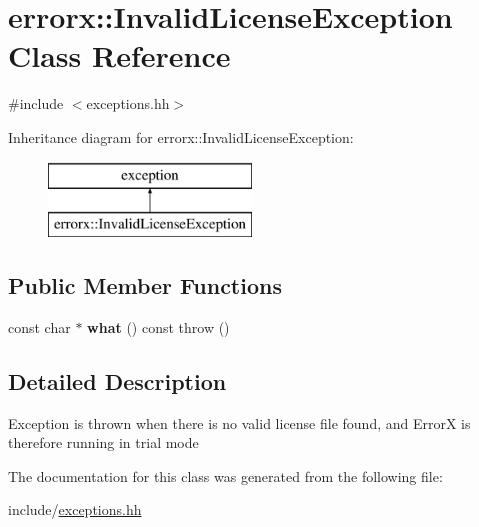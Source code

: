 \hypertarget{classerrorx_1_1_invalid_license_exception}{}\section{errorx\+:\+:Invalid\+License\+Exception Class Reference}
\label{classerrorx_1_1_invalid_license_exception}


{\ttfamily \#include $<$exceptions.\+hh$>$}

Inheritance diagram for errorx\+:\+:Invalid\+License\+Exception\+:\begin{figure}[H]
\begin{center}
\leavevmode
\includegraphics[height=2.000000cm]{classerrorx_1_1_invalid_license_exception}
\end{center}
\end{figure}
\subsection*{Public Member Functions}
\begin{DoxyCompactItemize}
\item 
\mbox{\label{classerrorx_1_1_invalid_license_exception_a4887ce2b1956fb57847172088f37b120}} 
const char $\ast$ {\bfseries what} () const  throw ()
\end{DoxyCompactItemize}


\subsection{Detailed Description}
Exception is thrown when there is no valid license file found, and ErrorX is therefore running in trial mode 

The documentation for this class was generated from the following file\+:\begin{DoxyCompactItemize}
\item 
include/\mbox{\hyperlink{exceptions_8hh}{exceptions.\+hh}}\end{DoxyCompactItemize}
